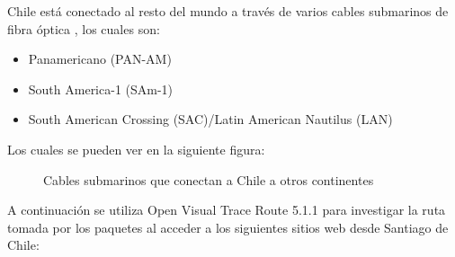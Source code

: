 \documentclass{article}
\begin{document}
Chile está conectado al resto del mundo a través de varios cables submarinos de fibra óptica \citep{website:telegeography}, los cuales son:

\begin{itemize}
  \item Panamericano (PAN-AM)
  \item South America-1 (SAm-1)
  \item South American Crossing (SAC)/Latin American Nautilus (LAN)
\end{itemize}

Los cuales se pueden ver en la siguiente figura:

\begin{figure}[H]
\centering
\setlength\fboxsep{0pt}
\setlength\fboxrule{0.5pt}
\caption{Cables submarinos que conectan a Chile a otros continentes}
\label{fig:cables submarinos}
\end{figure}

A continuación se utiliza Open Visual Trace Route 5.1.1 para investigar la ruta tomada por los paquetes al acceder a los siguientes sitios web desde Santiago de Chile:
\clearpage
\end{document}
